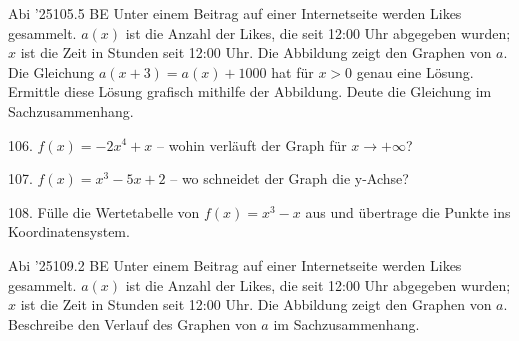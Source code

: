 \documentclass[11pt]{article}
\begin{document}
\pfgruppe{}
\begin{pfaufg}{Abi ’25}{105.}{5 BE}
Unter einem Beitrag auf einer Internetseite werden Likes gesammelt. $a(x)$ ist die Anzahl der Likes, die seit 12:00 Uhr abgegeben wurden; $x$ ist die Zeit in Stunden seit 12:00 Uhr. Die Abbildung zeigt den Graphen von $a$. Die Gleichung $a(x + 3) = a(x) + 1000$ hat für $x > 0$ genau eine Lösung. Ermittle diese Lösung grafisch mithilfe der Abbildung. Deute die Gleichung im Sachzusammenhang.
\par\smallskip\noindent {}\par
{}
\end{pfaufg}
\begin{pfaufg}{}{106.}{}
$f(x) = -2x^4 + x$ – wohin verläuft der Graph für $x \to +\infty$? 
\end{pfaufg}
\begin{pfaufg}{}{107.}{}
$f(x) = x^3 - 5x + 2$ – wo schneidet der Graph die y-Achse? 
\end{pfaufg}
\pfgruppe{}
\begin{pfaufg}{}{108.}{}
Fülle die Wertetabelle von $f(x) = x^3 - x$ aus und übertrage die Punkte ins Koordinatensystem.
\par\smallskip\noindent {}\begin{ksys}[xmin=-3,xmax=3,ymin=-7,ymax=7]\end{ksys}\par
\end{pfaufg}
\pfgruppe{}
\begin{pfaufg}{Abi ’25}{109.}{2 BE}
Unter einem Beitrag auf einer Internetseite werden Likes gesammelt. $a(x)$ ist die Anzahl der Likes, die seit 12:00 Uhr abgegeben wurden; $x$ ist die Zeit in Stunden seit 12:00 Uhr. Die Abbildung zeigt den Graphen von $a$. Beschreibe den Verlauf des Graphen von $a$ im Sachzusammenhang.
\par\smallskip\noindent {}\par
{}
\end{pfaufg}
\end{document}
